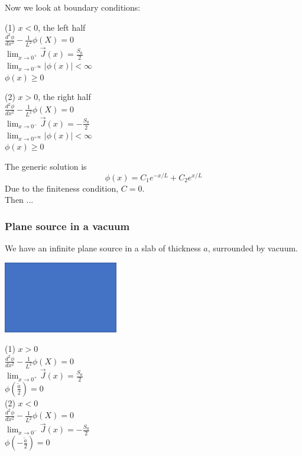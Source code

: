 \documentclass{report}
\newcommand{\tab}{\-\hspace{1cm}}
\newcommand{\hhh}[1]{\subsubsection*{#1}}
\newcommand{\cur}{\vec{J}}
\begin{document}
Now we look at boundary conditions:
\begin{multicols}{2}
(1) $x<0$, the left half\\
	\tab $\frac{d^2\phi}{dx^2} - \frac{1}{L^2}\phi(X) = 0$\\
	\tab $\lim_{x\rightarrow0^+}\cur(x) = \frac{S_0}{2}$\\
	
	\tab $\lim_{x\rightarrow0^{-\infty}}|\phi(x)| < \infty$\\
	\tab $\phi(x) \geq 0$
	
(2) $x>0$, the right half\\
	\tab $\frac{d^2\phi}{dx^2} - \frac{1}{L^2}\phi(X) = 0$\\
	\tab $\lim_{x\rightarrow0^-}\cur(x) = -\frac{S_0}{2}$\\
	
	\tab $\lim_{x\rightarrow0^{+\infty}}|\phi(x)| < \infty$\\
	\tab $\phi(x) \geq 0$
\end{multicols}

The generic solution is \\
$$ \phi(x) = C_1e^{-x/L} + C_2e^{x/L} $$
Due to the finiteness condition, $C=0$.\\
Then ...

\hhh{Plane source in a vacuum}

We have an infinite plane source in a slab of thickness $a$, surrounded by vacuum.

\includegraphics[width=5cm]{inf_slab_vacuum}

\begin{multicols}{2}
(1) $x>0$ \\
	\tab $\frac{d^2\phi}{dx^2} - \frac{1}{L^2}\phi(X) = 0$ \\
	\tab $\lim_{x\rightarrow0^+}\cur(x) = \frac{S_0}{2}$ \\
	\tab $\phi(\frac{\tilde{a}}{2})=0$ \\
	
(2) $x<0$ \\
	\tab $\frac{d^2\phi}{dx^2} - \frac{1}{L^2}\phi(X) = 0$ \\
	\tab $\lim_{x\rightarrow0^-}\cur(x) = -\frac{S_0}{2}$ \\
	\tab $\phi(-\frac{\tilde{a}}{2})=0$ \\
\end{multicols}
\end{document}
